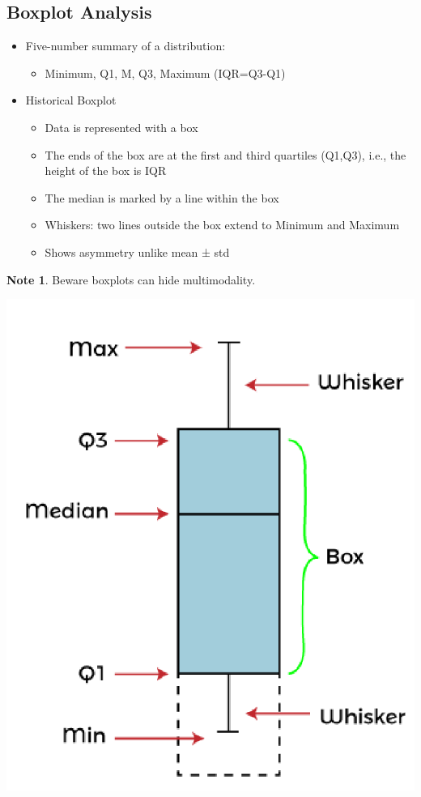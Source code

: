 \documentclass[11pt]{article}
\theoremstyle{definition}
\newtheorem{note}{Note}
\begin{document}
\subsection{Boxplot Analysis}
\begin{itemize}
    \item Five-number summary of a distribution:
    \begin{itemize}
        \item Minimum, Q1, M, Q3, Maximum (IQR=Q3-Q1)
    \end{itemize}
    \item Historical Boxplot
    \begin{itemize}
        \item Data is represented with a box
        \item The ends of the box are at the first and third
        quartiles (Q1,Q3), i.e., the height of the box is IQR
        \item The median is marked by a line within the box
        \item Whiskers: two lines outside the box extend to
        Minimum and Maximum
        \item Shows asymmetry unlike mean ± std 
    \end{itemize}
\end{itemize}
\begin{note}
    Beware boxplots can hide multimodality.
    
    \includegraphics[height=\textheight/4]{8.png}
\end{note}
\end{document}
